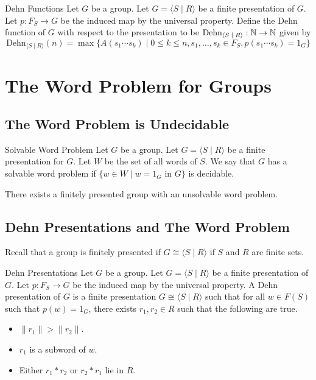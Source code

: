 \documentclass[a4paper]{article}
\begin{document}
\begin{defn}{Dehn Functions}{} Let $G$ be a group. Let $G=\langle S\;|\;R\rangle$ be a finite presentation of $G$. Let $p:F_S\to G$ be the induced map by the universal property. Define the Dehn function of $G$ with respect to the presentation to be $\text{Dehn}_{\langle S\;|\;R\rangle}:\mathbb{N}\to\mathbb{N}$ given by $$\text{Dehn}_{\langle S\;|\;R\rangle}(n)=\max\{A(s_1\cdots s_k)\;|\;0\leq k\leq n, s_1,\dots,s_k\in F_S, p(s_1\cdots s_k)=1_G\}$$
\end{defn}

\pagebreak
\section{The Word Problem for Groups}
\subsection{The Word Problem is Undecidable}
\begin{defn}{Solvable Word Problem}{} Let $G$ be a group. Let $G=\langle S\;|\;R\rangle$ be a finite presentation for $G$. Let $W$ be the set of all words of $S$. We say that $G$ has a solvable word problem if $\{w\in W\;|\;w=1_G\text{ in }G\}$ is decidable. 
\end{defn}

\begin{thm}{}{} There exists a finitely presented group with an unsolvable word problem. 
\end{thm}

\subsection{Dehn Presentations and The Word Problem}
Recall that a group is finitely presented if $G\cong\langle S\;|\;R\rangle$ if $S$ and $R$ are finite sets. 

\begin{defn}{Dehn Presentations}{} Let $G$ be a group. Let $G=\langle S\;|\;R\rangle$ be a finite presentation of $G$. Let $p:F_S\to G$ be the induced map by the universal property. A Dehn presentation of $G$ is a finite presentation $G\cong\langle S\;|\;R\rangle$ such that for all $w\in F(S)$ such that $p(w)=1_G$, there exists $r_1,r_2\in R$ such that the following are true. 
\begin{itemize}
\item $\|r_1\|>\|r_2\|$. 
\item $r_1$ is a subword of $w$. 
\item Either $r_1\ast r_2$ or $r_2\ast r_1$ lie in $R$. 
\end{itemize}
\end{defn}
\end{document}
